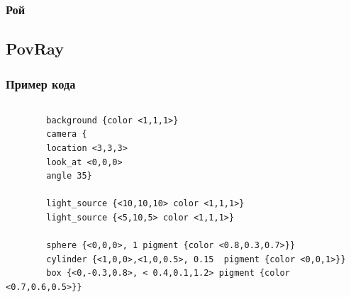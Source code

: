 \documentclass{beamer}
\begin{document}
\subsubsection{Рой}
\subsection{PovRay}
\begin{frame}[fragile]
\frametitle{Пример кода}

\begin{columns}
	\begin{column}{8cm}
	\begin{verbatim}
		background {color <1,1,1>}
		camera {
		location <3,3,3>
		look_at <0,0,0>
		angle 35}

		light_source {<10,10,10> color <1,1,1>}
		light_source {<5,10,5> color <1,1,1>}
		
		sphere {<0,0,0>, 1 pigment {color <0.8,0.3,0.7>}}
		cylinder {<1,0,0>,<1,0,0.5>, 0.15  pigment {color <0,0,1>}}     
		box {<0,-0.3,0.8>, < 0.4,0.1,1.2> pigment {color <0.7,0.6,0.5>}} 

	\end{verbatim}
	\end{column}
	\begin{column}{4.5cm}
	\end{column}
\end{columns}
	
  
\end{frame}
\end{document}
